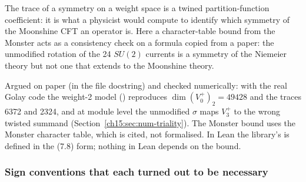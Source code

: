 \begin{physics}
The trace of a symmetry on a weight space is a twined partition-function coefficient: it is what
a physicist would compute to identify which symmetry of the Moonshine CFT an operator is. Here a
character-table bound from the Monster acts as a consistency check on a formula copied from a
paper: the unmodified rotation of the 24 $SU(2)$ currents is a symmetry of the Niemeier theory but
not one that extends to the Moonshine theory.
\end{physics}

\begin{status}
Argued on paper (in the file docstring) and checked numerically: with the real Golay code the
weight-2 model () reproduces $\dim(V_0^+)_2=49428$ and
the traces 6372 and 2324, and at module level the unmodified $\sigma$ maps $V_3^+$ to the wrong
twisted summand (Section~\ref{ch15:sec:num-triality}). The Monster bound uses the Monster character
table, which is cited, not formalised. In Lean the library's  is defined in the
(7.8) form; nothing in Lean depends on the bound.
\end{status}

\subsubsection{Sign conventions that each turned out to be necessary}

